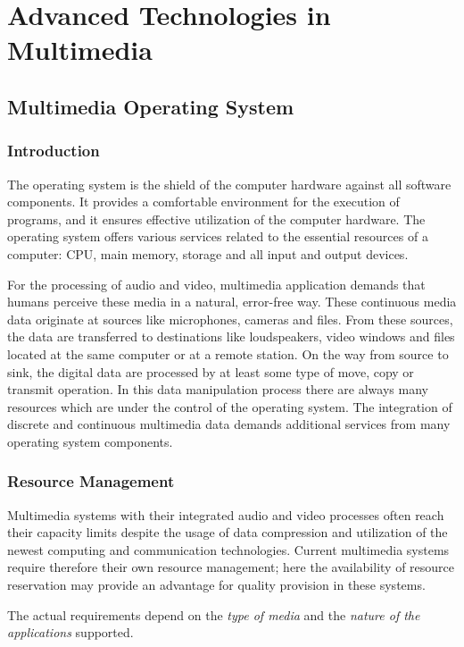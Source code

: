 \chapter{Advanced Technologies in Multimedia}


\section{Multimedia Operating System}
\subsection{Introduction}

The operating system is the shield of the computer hardware against all software components. It provides a comfortable environment for the execution of programs, and it ensures effective utilization of the computer hardware. The operating system offers various services related to the essential resources of a computer: CPU, main memory, storage and all input and output devices.

For the processing of audio and video, multimedia application demands that humans perceive these media in a natural, error-free way. These continuous media data originate at sources like microphones, cameras and files. From these sources, the data
are transferred to destinations like loudspeakers, video windows and files located at the same computer or at a remote station. On the way from source to sink, the digital data are processed by at least some type of move, copy or transmit operation. In this data
manipulation process there are always many resources which are under the control of the operating system. The integration of discrete and continuous multimedia data demands additional services from many operating system components.


\subsection{Resource Management}
	Multimedia systems with their integrated audio and video processes often reach their capacity limits despite the usage of data compression and utilization of the newest computing and communication technologies. Current multimedia systems require therefore their own resource management; here the availability of resource reservation may provide an advantage for quality provision in these systems. 
	
	The actual requirements depend on the \textit{type of media} and the \textit{nature of the applications} supported. 
	
